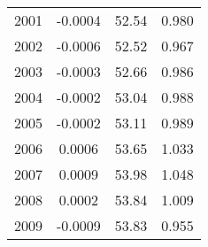 \begin{tabular}{cccc}
  2001 & -0.0004 & 52.54 & 0.980 \\ 
  2002 & -0.0006 & 52.52 & 0.967 \\ 
  2003 & -0.0003 & 52.66 & 0.986 \\ 
  2004 & -0.0002 & 53.04 & 0.988 \\ 
  2005 & -0.0002 & 53.11 & 0.989 \\ 
  2006 & 0.0006 & 53.65 & 1.033 \\ 
  2007 & 0.0009 & 53.98 & 1.048 \\ 
  2008 & 0.0002 & 53.84 & 1.009 \\ 
  2009 & -0.0009 & 53.83 & 0.955 \\ 
   \hline
\end{tabular}
